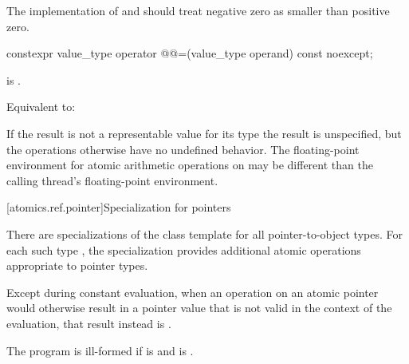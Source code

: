 \begin{itemdescr}
\pnum
\recommended
The implementation of  and 
should treat negative zero as smaller than positive zero.
\end{itemdescr}

%
%
\begin{itemdecl}
constexpr value_type operator @@=(value_type operand) const noexcept;
\end{itemdecl}

\begin{itemdescr}
\pnum
\constraints
{} is .

\pnum
\effects
Equivalent to:

\pnum
\remarks
If the result is not a representable value for its type
the result is unspecified, but
the operations otherwise have no undefined behavior.
The floating-point environment
for atomic arithmetic operations on 
may be different than the calling thread's floating-point environment.
\end{itemdescr}

[atomics.ref.pointer]{Specialization for pointers}
%

\pnum
There are specializations of the  class template
for all pointer-to-object types.
For each such type ,
the specialization  provides
additional atomic operations appropriate to pointer types.

\pnum
Except during constant evaluation,
when an operation on an atomic pointer
would otherwise result in a pointer value 
that is not valid in the context of the evaluation,
that result instead is
.

\pnum
The program is ill-formed
if  is  and
 is .

